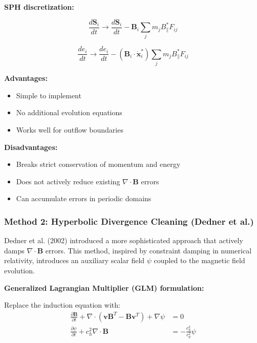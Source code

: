\documentclass[12pt,a4paper]{article}
\begin{document}
\textbf{SPH discretization:}

\begin{equation}
\frac{d\bm{S}_i}{dt} \rightarrow \frac{d\bm{S}_i}{dt} - \bm{B}_i \sum_j m_j B_\parallel^* F_{ij}
\label{eq:powell_momentum}
\end{equation}

\begin{equation}
\frac{de_i}{dt} \rightarrow \frac{de_i}{dt} - (\bm{B}_i \cdot \dot{\bm{x}}_i^*) \sum_j m_j B_\parallel^* F_{ij}
\label{eq:powell_energy}
\end{equation}

\textbf{Advantages:}
\begin{itemize}
    \item Simple to implement
    \item No additional evolution equations
    \item Works well for outflow boundaries
\end{itemize}

\textbf{Disadvantages:}
\begin{itemize}
    \item Breaks strict conservation of momentum and energy
    \item Does not actively reduce existing $\nabla \cdot \bm{B}$ errors
    \item Can accumulate errors in periodic domains
\end{itemize}

\subsubsection{Method 2: Hyperbolic Divergence Cleaning (Dedner et al.)}

Dedner et al. (2002) introduced a more sophisticated approach that actively
damps $\nabla \cdot \bm{B}$ errors. This method, inspired by constraint damping
in numerical relativity, introduces an auxiliary scalar field $\psi$ coupled
to the magnetic field evolution.

\textbf{Generalized Lagrangian Multiplier (GLM) formulation:}

Replace the induction equation with:
\begin{align}
\frac{\partial \bm{B}}{\partial t} + \nabla \cdot (\bm{v}\bm{B}^T - \bm{B}\bm{v}^T) + \nabla\psi &= 0
\label{eq:glm_induction} \\
\frac{\partial \psi}{\partial t} + c_h^2 \nabla \cdot \bm{B} &= -\frac{c_h^2}{c_p^2}\psi
\label{eq:glm_psi}
\end{align}
\end{document}
